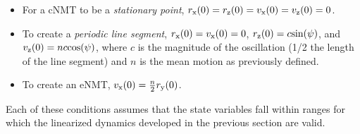 \documentclass[twocolumn,letterpaper]{IEEEAerospaceCLS}  %
\theoremstyle{definition}
\begin{document}
\begin{itemize}
  \item For a cNMT to be a \textit{stationary point}, $r_{\rm x}(0)= r_{\rm z}(0) = v_{\rm x}(0) = v_{\rm z}(0) = 0$. 
  \item To create a \textit{periodic line segment},
  $r_{\rm x}(0)= v_{\rm x}(0)= 0$, $r_{\rm z}(0) = c\text{sin}(\psi)$, and $v_{\rm z}(0) = n c \text{cos}(\psi)$, where $c$ is the magnitude of the oscillation (1/2 the length of the line segment) and $n$ is the mean motion as previously defined.
  \item To create an eNMT, $v_{\rm x}(0) = \frac{n}{2} r_{\rm y}(0)$.
\end{itemize} 
Each of these conditions assumes that the state variables fall within ranges for which the linearized dynamics developed in the previous section are valid. 


\end{document}
